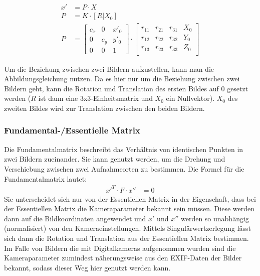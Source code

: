 \documentclass[a4paper,12pt,bibliography=totoc, listof=totoc,titlepage]{scrreprt}
\begin{document}
\begin{align}
    \label{abbildungsgleichung}
    x' & = P \cdot X       \\
    P  & = K \cdot [R|X_0] \\
    P  & =
    \begin{bmatrix}
        c_x & 0   & x'_0 \\
        0   & c_y & y'_0 \\
        0   & 0   & 1
    \end{bmatrix}
    \cdot
    \begin{bmatrix}
        r_11 & r_21 & r_31 & X_0 \\
        r_12 & r_22 & r_32 & Y_0 \\
        r_13 & r_23 & r_33 & Z_0 \\
    \end{bmatrix}
\end{align}

Um die Beziehung zwischen zwei Bildern aufzustellen, kann man die Abbildungsgleichung nutzen. Da es hier nur um die Beziehung zwischen zwei Bildern geht, kann die Rotation und Translation des ersten Bildes auf 0 gesetzt werden ($R$ ist dann eine 3x3-Einheitsmatrix und $X_0$ ein Nullvektor). $X_0$ des zweiten Bildes wird zur Translation zwischen den beiden Bildern. \citep[S. 326]{luhmann4}

\subsubsection{Fundamental-/Essentielle Matrix}
Die Fundamentalmatrix beschreibt das Verhältnis von identischen Punkten in zwei Bildern zueinander. Sie kann genutzt werden, um die Drehung und Verschiebung zwischen zwei Aufnahmeorten zu bestimmen. Die Formel für die Fundamentalmatrix lautet:
\begin{align}
    x'^T \cdot F \cdot x'' & = 0
\end{align}
Sie unterscheidet sich nur von der Essentiellen Matrix in der Eigenschaft, dass bei der Essentiellen Matrix die Kameraparameter bekannt sein müssen. Diese werden dann auf die Bildkoordinaten angewendet und $x'$ und $x''$ werden so unabhängig (normalisiert) von den Kameraeinstellungen. Mittels Singulärwertzerlegung lässt sich dann die Rotation und Translation aus der Essentiellen Matrix bestimmen. Im Falle von Bildern die mit Digitalkameras aufgenommen wurden sind die Kameraparameter zumindest näherungsweise aus den EXIF-Daten der Bilder bekannt, sodass dieser Weg hier genutzt werden kann. \citep[S. 257]{hartley}
\end{document}
